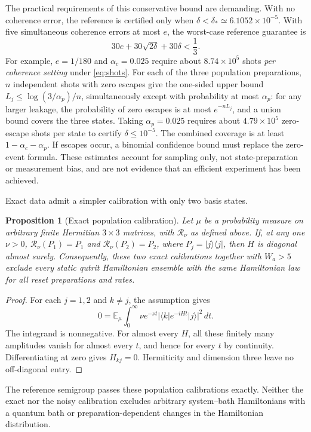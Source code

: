 \documentclass[11pt,a4paper]{article}
\newtheorem{proposition}[theorem]{Proposition}
\newcommand{\E}{\mathbb E}
\begin{document}
The practical requirements of this conservative bound are demanding.
With no coherence error, the reference is certified only when
$\delta<\delta_*\simeq6.1052\times10^{-5}$. With five simultaneous
coherence errors at most $e$, the worst-case reference guarantee is
\[
 30e+30\sqrt{2\delta}+30\delta<\frac13.
\]
For example, $e=1/180$ and $\alpha_c=0.025$ require about
$8.74\times10^5$ shots \emph{per coherence setting} under
\eqref{eq:shots}. For each of the three population preparations,
$n$ independent shots with zero escapes give the one-sided upper
bound $L_j\leq\log(3/\alpha_p)/n$, simultaneously except with
probability at most $\alpha_p$: for any larger leakage, the
probability of zero escapes is at most $e^{-nL_j}$, and a union
bound covers the three states. Taking $\alpha_p=0.025$ requires
about $4.79\times10^5$ zero-escape shots per state to certify
$\delta\leq10^{-5}$. The combined coverage is at least
$1-\alpha_c-\alpha_p$. If escapes occur, a binomial confidence
bound must replace the zero-event formula. These estimates account
for sampling only, not state-preparation or measurement bias, and
are not evidence that an efficient experiment has been achieved.

Exact data admit a simpler calibration with only two basis states.

\begin{proposition}[Exact population calibration]\label{prop:diag}
Let $\mu$ be a probability measure on arbitrary finite Hermitian
$3\times3$ matrices, with $\mathcal R_\nu$ as defined above.
If, at any one $\nu>0$,
$\mathcal R_\nu(P_1)=P_1$ and $\mathcal R_\nu(P_2)=P_2$,
where $P_j=|j\rangle\langle j|$, then $H$ is diagonal almost surely.
Consequently, these two exact calibrations together with
$W_a>5$ exclude every static qutrit Hamiltonian ensemble with the
same Hamiltonian law for all reset preparations and rates.
\end{proposition}
\begin{proof}
For each $j=1,2$ and $k\ne j$, the assumption gives
\[
 0=\E_\mu\int_0^\infty\nu e^{-\nu t}
                 |\langle k|e^{-iHt}|j\rangle|^2\,dt.
\]
The integrand is nonnegative. For almost every $H$, all these
finitely many amplitudes vanish for almost every $t$, and hence for
every $t$ by continuity. Differentiating at zero gives
$H_{kj}=0$. Hermiticity and dimension three leave no off-diagonal
entry.
\end{proof}

The reference semigroup passes these population calibrations exactly.
Neither the exact nor the noisy calibration excludes arbitrary
system--bath Hamiltonians with a quantum bath or preparation-dependent
changes in the Hamiltonian distribution.
\end{document}
